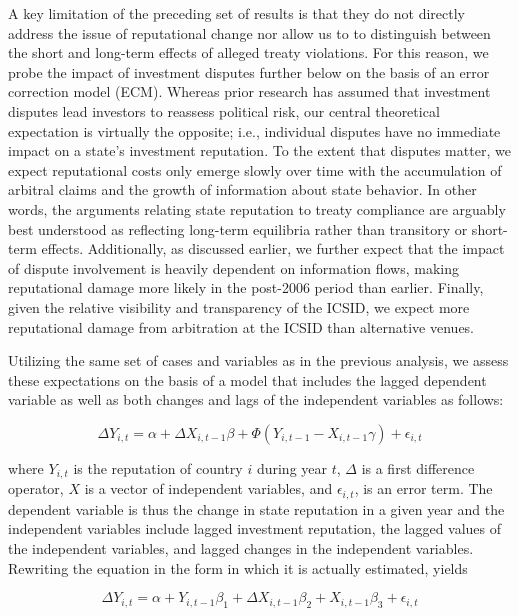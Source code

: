 \documentclass[12pt,onesided]{amsart}
\begin{document}
A key limitation of the preceding set of results is that they do not directly address the issue of reputational change nor allow us to to distinguish between the short and long-term effects of alleged treaty violations. For this reason, we probe the impact of investment disputes further below on the basis of an error correction model (ECM). Whereas prior research has assumed that investment disputes lead investors to reassess political risk, our central theoretical expectation is virtually the opposite; i.e., individual disputes have no immediate impact on a state's investment reputation. To the extent that disputes matter, we expect reputational costs only emerge slowly over time with the accumulation of arbitral claims and the growth of information about state behavior. In other words, the arguments relating state reputation to treaty compliance are arguably best understood as reflecting long-term equilibria rather than transitory or short-term effects. Additionally, as discussed earlier, we further expect that the impact of dispute involvement is heavily dependent on information flows, making reputational damage more likely in the post-2006 period than earlier. Finally, given the relative visibility and transparency of the ICSID, we expect more reputational damage from arbitration at the ICSID than alternative venues.

Utilizing the same set of cases and variables as in the previous analysis, we assess these expectations on the basis of a model that includes the lagged dependent variable as well as both changes and lags of the independent variables as follows:

\begin{equation}
\Delta Y_{i,t} = \alpha + \Delta X_{i,t-1} \beta + \Phi(Y_{i,t-1} - X_{i,t-1} \gamma) + \epsilon_{i,t}
\end{equation}

where $Y_{i,t}$ is the reputation of country $i$ during year $t$, $\Delta$ is a first difference operator, $X$ is a vector of independent variables, and $\epsilon_{i,t}$, is an error term. The dependent variable is thus the change in state reputation in a given year and the independent variables include lagged investment reputation, the lagged values of the independent variables, and lagged changes in the independent variables. Rewriting the equation in the form in which it is actually estimated, yields

\begin{equation}
\Delta Y_{i,t} = \alpha + Y_{i,t-1} \beta_{1} + \Delta X_{i,t-1} \beta_{2} + X_{i, t-1} \beta_{3} + \epsilon_{i,t}
\end{equation}
\end{document}
